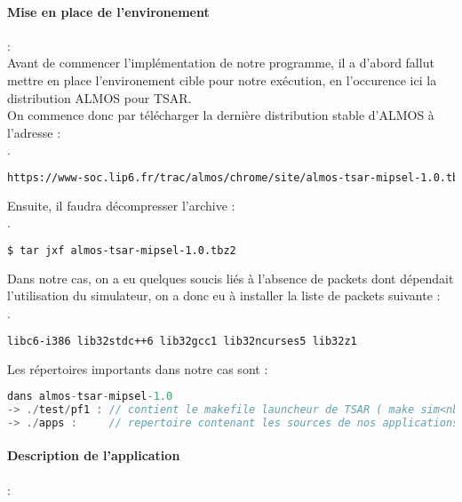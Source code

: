 \paragraph{Mise en place de l'environement}:\\

Avant de commencer l'implémentation de notre programme, il a d'abord fallut mettre en place l'environement cible pour notre exécution, en l'occurence ici la distribution ALMOS pour TSAR.\\

On commence donc par télécharger la dernière distribution stable d'ALMOS à l'adresse :\\
.\\
\begin{DDbox}{\linewidth}
\begin{lstlisting}[language=bash]
https://www-soc.lip6.fr/trac/almos/chrome/site/almos-tsar-mipsel-1.0.tbz2
\end{lstlisting}
\end{DDbox}
Ensuite, il faudra décompresser l'archive :\\
.\\
\begin{DDbox}{\linewidth}
\begin{lstlisting}[language=bash]
$ tar jxf almos-tsar-mipsel-1.0.tbz2
\end{lstlisting}
\end{DDbox}
Dans notre cas, on a eu quelques soucis liés à l'absence de packets dont dépendait l'utilisation du simulateur, on a donc eu à installer la liste de packets suivante :\\
.\\
\begin{DDbox}{\linewidth}
\begin{lstlisting}[language=bash]
libc6-i386 lib32stdc++6 lib32gcc1 lib32ncurses5 lib32z1
\end{lstlisting}
\end{DDbox}
Les répertoires importants dans notre cas sont :\\
\begin{DDbox}{\linewidth}
\begin{lstlisting}[language=C]
dans almos-tsar-mipsel-1.0
-> ./test/pf1 : // contient le makefile launcheur de TSAR ( make sim<nb_clusters> )
-> ./apps :     // repertoire contenant les sources de nos applications
\end{lstlisting}
\end{DDbox}

\paragraph{Description de l'application}:\\

